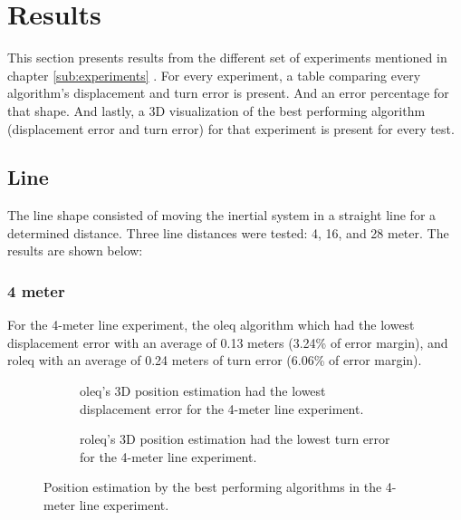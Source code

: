 \section{Results}

This section presents results from the different set of experiments mentioned in chapter \ref{sub:experiments} . For every experiment, a table comparing every algorithm's displacement and turn error is present. And an error percentage for that shape. And lastly, a 3D visualization of the best performing algorithm (displacement error and turn error) for that experiment is present for every test.

\subsection{Line}

The line shape consisted of moving the inertial system in a straight line for a determined distance. Three line distances were tested: 4, 16, and 28 meter. The results are shown below:

\subsubsection{4 meter}

For the 4-meter line experiment, the \acrshort{oleq} algorithm which had the lowest displacement error with an average of 0.13 meters (3.24\% of error margin), and \acrshort{roleq} with an average of 0.24 meters of turn error (6.06\% of error margin).



\begin{figure}[H]
    \centering
    \begin{subfigure}{0.49\textwidth}
        \centering
        \resizebox{1\linewidth}{!}{}
        \caption{ \acrshort{oleq}'s 3D position estimation had the lowest displacement error for the 4-meter line experiment. }
        \label{fig:line4_2D}
    \end{subfigure}
    \begin{subfigure}{0.49\textwidth}
        \centering
        \resizebox{1\linewidth}{!}{}
        \caption{ \acrshort{roleq}'s 3D position estimation had the lowest turn error for the 4-meter line experiment. }
        \label{fig:line4_3D}
    \end{subfigure}
    \caption{Position estimation by the best performing algorithms in the 4-meter line experiment.}
    \label{fig:line4}
\end{figure}


